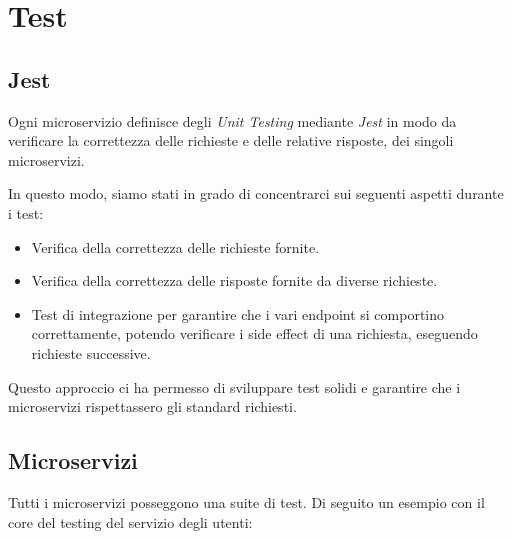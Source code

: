 \chapter{Test}

%
%
%
\section{Jest}

Ogni microservizio definisce degli \emph{Unit Testing} mediante \emph{Jest} in modo da verificare la correttezza delle richieste e delle relative risposte, dei singoli microservizi.

In questo modo, siamo stati in grado di concentrarci sui seguenti aspetti durante i test:

\begin{itemize}
    \item Verifica della correttezza delle richieste fornite.

    \item Verifica della correttezza delle risposte fornite da diverse richieste.

    \item Test di integrazione per garantire che i vari endpoint si comportino correttamente, potendo verificare i side effect di una richiesta, eseguendo richieste successive.
\end{itemize}

Questo approccio ci ha permesso di sviluppare test solidi e garantire che i microservizi rispettassero gli standard richiesti.

%
%
%
\section{Microservizi}

Tutti i microservizi posseggono una suite di test.
%
Di seguito un esempio con il core del testing del servizio degli utenti:

